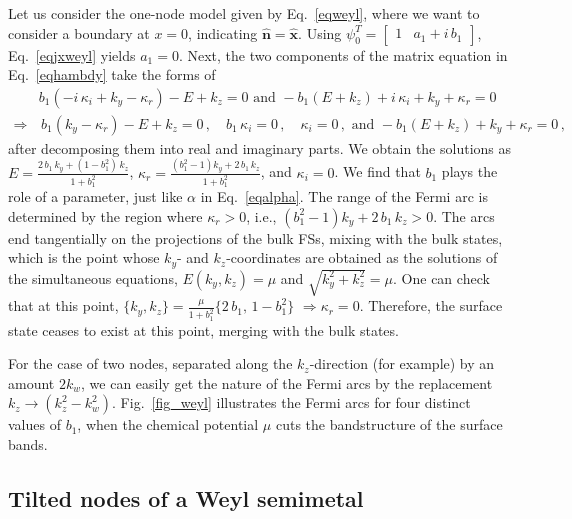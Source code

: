 \documentclass[aps,prb,onecolumn, footinbib, 10pt]{revtex4-2}
\def \nn{\nonumber \\}
\begin{document}
Let us consider the one-node model given by Eq.~\eqref{eqweyl}, where we want to consider a boundary at $x=0$, indicating $\boldsymbol{\hat n} = \boldsymbol{\hat x} $. Using $ \psi_0^T  = \begin{bmatrix}
1 & a_1 +i \, b_1 \end{bmatrix}$, Eq.~\eqref{eqjxweyl} yields $ a_1  =  0 $. Next, the two components of the matrix equation in Eq.~\eqref{eqhambdy} take the forms of
\begin{align}
& b_1 \left(-i \,\kappa_i+k_y-\kappa_r\right)- E +k_z   = 0 
\text{ and }
-b_1 \left( E + k_z\right)+i \,\kappa_i+k_y+\kappa_r = 0 \nn
\Rightarrow & \, b_1 \left(k_y-\kappa_r\right)- E +k_z = 0\,, \quad 
b_1 \,\kappa_i = 0 \,, \quad \kappa_i = 0 \,, \text{ and }
-b_1 \left(E +k_z\right)+k_y+\kappa_r = 0\,,
\end{align}
after decomposing them into real and imaginary parts.
We obtain the solutions as $E = \frac{2 \,b_1\, k_y +(1- b_1^2)\, k_z} { 1 + b_1^2 }$, $\kappa_r 
= \frac{\left(b_1^2-1\right) k_y+2 \,b_1\, k_z} { 1 + b_1^2 } $, and $\kappa_i = 0$. We find that $b_1$ plays the role of a parameter, just like $\alpha$ in Eq.~\eqref{eqalpha}. The range of the Fermi arc is determined by the region where $\kappa_r > 0 $, i.e., $ \left(b_1^2-1\right) k_y+2 \,b_1\, k_z > 0$.  The arcs end tangentially on the projections of the bulk FSs, mixing with the bulk states, which is the point whose $k_y$- and $k_z$-coordinates are obtained as the solutions of the simultaneous equations, $E (k_y, k_z) =\mu$ and $\sqrt{k_y^2 + k_z^2} = \mu$. One can check that at this point, $\lbrace 
k_y, k_z \rbrace = \frac{\mu } { 1+b_1^2 } \lbrace 2\, b_1 , \, 1- b_1^2 \rbrace $ $\Rightarrow \kappa_r = 0 $. Therefore, the surface state ceases to exist at this point, merging with the bulk states.  

For the case of two nodes, separated along the $ k_z$-direction (for example) by an amount $2k_w$, we can easily get the nature of the Fermi arcs by the replacement $ k_z \rightarrow (k_z^2 - k_w^2)$. Fig.~\ref{fig_weyl} illustrates the Fermi arcs for four distinct values of $b_1$, when the chemical potential $\mu$ cuts the bandstructure of the surface bands.



\subsection{Tilted nodes of a Weyl semimetal}
\end{document}
